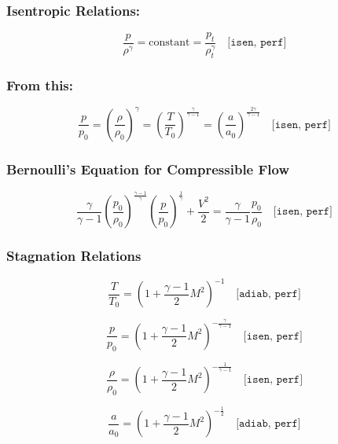\subsubsection*{Isentropic Relations:}

\begin{equation}
	\frac{p}{\rho^\gamma} = \text{constant} = \frac{p_t}{\rho_t^\gamma}
	\quad \texttt{[isen, perf]}
\end{equation}

\subsubsection*{From this:}

\begin{equation}
	\frac{p}{p_0} = \left( \frac{\rho}{\rho_0} \right)^\gamma = \left( \frac{T}{T_0} \right)^{\frac{\gamma}{\gamma - 1}} = \left( \frac{a}{a_0} \right)^{\frac{2\gamma}{\gamma - 1}}
	\quad \texttt{[isen, perf]}
\end{equation}

\subsubsection*{Bernoulli's Equation for Compressible Flow}

\begin{equation}
	\frac{\gamma}{\gamma - 1} \left( \frac{p_0}{\rho_0} \right)^{\frac{\gamma - 1}{\gamma}} \left( \frac{p}{p_0} \right)^{\frac{1}{\gamma}} + \frac{V^2}{2} = \frac{\gamma}{\gamma - 1} \frac{p_0}{\rho_0} 
	\quad \texttt{[isen, perf]}
\end{equation}

\subsubsection*{Stagnation Relations}

\begin{equation}
	\frac{T}{T_0} = \left( 1 + \frac{\gamma - 1}{2} M^2 \right)^{-1}
	\quad \texttt{[adiab, perf]}
	\label{eq:total_relation_T}
\end{equation}

\begin{equation}
	\frac{p}{p_0} = \left( 1 + \frac{\gamma - 1}{2} M^2 \right)^{-\frac{\gamma}{\gamma - 1}}
	\quad \texttt{[isen, perf]}
	\label{eq:total_relation_p}
\end{equation}

\begin{equation}
	\frac{\rho}{\rho_0} = \left( 1 + \frac{\gamma - 1}{2} M^2 \right)^{-\frac{1}{\gamma - 1}}
	\quad \texttt{[isen, perf]}
	\label{eq:total_relation_rho}
\end{equation}

\begin{equation}
	\frac{a}{a_0} = \left( 1 + \frac{\gamma - 1}{2} M^2 \right)^{-\frac{1}{2}}
	\quad \texttt{[adiab, perf]}
\end{equation}

\blankpage
